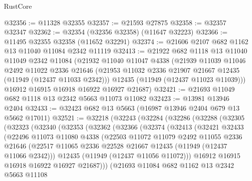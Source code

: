 \begin{lexlean}{RustCore}
\begin{coremodule}
@32356 := @11328 @32355
@32357 := @21593 @27875
@32358 := @32357 @32347
@32362 := @32354 (@32356 @32358) (@11647 @32223)
@32366 := @11495 @32355 @32358 (@11652 @32291)
@32374 := @21606 @2107 @682 @1162 @13 @11040 @11084 @2342 @11119
@32413 := @21922
    @682
    @1118
    @13
    @11040
    @11049
    @2342
    @11084
    (@21932
      @11040
      @11047
      @4338
      (@21939
        @11039
        @11046
        @2492
        @11022
        @2336
        @21646
        (@21953 @11032 @2336 @21907 @21667 @12435 (@11949 (@12437 @11033 @2342)))
        @12435
        (@11949 (@12437 @11023 @11039)))
      @16912
      @16915
      @16918
      @16922
      @16927
      @21687)
@32421 := @21693 @11049 @682 @1118 @13 @2342 @5663 @11073 @11082
@32423 := @13981 @13946 @2404
@32433 := @32423 @682 @13 @5663 (@16987 @13946 @2404 @679 @13 @5662 @17011)
@32521 := @32218
    (@32243
      (@32284
        (@32286
          (@32288
            (@32305
              (@32323
                (@32340
                  (@32353
                    (@32362
                      (@32366
                        (@32374
                          (@32413
                            (@32421
                              @32433
                              (@22496
                                @11073
                                @11080
                                @4338
                                (@22503
                                  @11072
                                  @11079
                                  @2492
                                  @11055
                                  @2336
                                  @21646
                                  (@22517
                                    @11065
                                    @2336
                                    @22528
                                    @21667
                                    @12435
                                    (@11949 (@12437 @11066 @2342)))
                                  @12435
                                  (@11949 (@12437 @11056 @11072)))
                                @16912
                                @16915
                                @16918
                                @16922
                                @16927
                                @21687)))
                          (@21693
                            @11084
                            @682
                            @1162
                            @13
                            @2342
                            @5663
                            @11108

\end{coremodule}
\end{lexlean}
